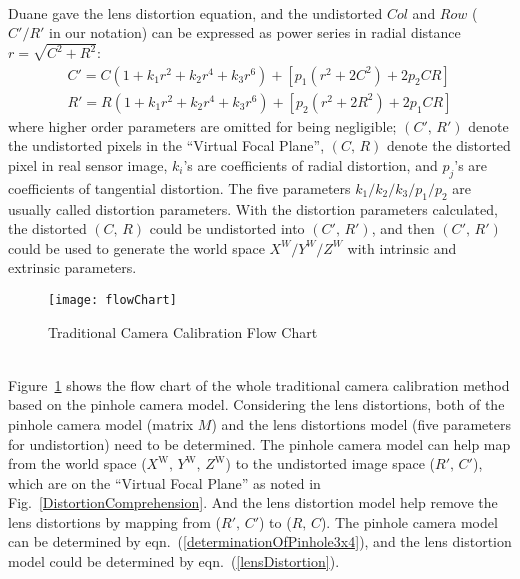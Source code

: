 \\\indent%
Duane \cite{distortion2_1966} gave the lens distortion equation, and the undistorted \(Col\) and \(Row\) (\(C'/R'\) in our notation) can be expressed as power series in radial distance \(r = \sqrt{C^2 + R^2}\):
%
\begin{equation}
\begin{aligned}
C' =  C (1 + k_1 r^2 + k_2 r^4 + k_3 r^6) + [p_1 (r^2 + 2 C^2) + 2 p_2 CR] %
\\
R' =  R (1 + k_1 r^2 + k_2 r^4 + k_3 r^6) + [p_2 (r^2 + 2 R^2) + 2 p_1 CR]
\end{aligned}
\label{lensDistortion}
\end{equation}%
%
\noindent
where higher order parameters are omitted for being negligible; \((C', \, R')\) denote the undistorted pixels in the \enquote{Virtual Focal Plane}, \((C, \, R)\) denote the distorted pixel in real sensor image, \(k_i\)'s are coefficients of radial distortion, and \(p_j\)'s are coefficients of tangential distortion. The five parameters \(k_1/k_2/k_3/p_1/p_2\) are usually called distortion parameters. With the distortion parameters calculated, the distorted \((C, \, R)\) could be undistorted into \((C', \, R')\), and then \((C', \, R')\) could be used to generate the world space \(X^W/Y^W/Z^W\) with intrinsic and extrinsic parameters.
%
\indent 
\begin{figure}[t]
\centering
\texttt{[image: flowChart]}
\caption{Traditional Camera Calibration Flow Chart}
\label{flowChart}
\end{figure}%
\\\indent
Figure~\ref{flowChart} shows the flow chart of the whole traditional camera calibration method based on the pinhole camera model. Considering the lens distortions, both of the pinhole camera model (matrix \(M\)) and the lens distortions model (five parameters for undistortion) need to be determined. The pinhole camera model can help map from the world space (\(X^\text{W}, \, Y^\text{W}, \, Z^\text{W}\)) to the undistorted image space (\(R', \, C'\)), which are on the \enquote{Virtual Focal Plane} as noted in Fig.~\ref{DistortionComprehension}. And the lens distortion model help remove the lens distortions by mapping from (\(R', \, C'\)) to (\(R, \, C\)). The pinhole camera model can be determined by eqn.~(\ref{determinationOfPinhole3x4}), and the lens distortion model could be determined by eqn.~(\ref{lensDistortion}).




